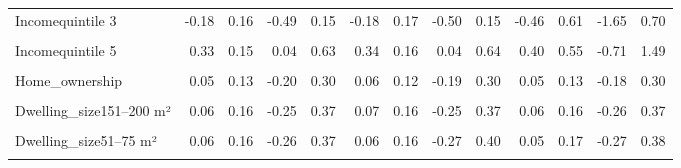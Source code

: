 \begin{table}
\begin{tabular}[t]{lrrrrrrrrrrrr}
Incomequintile 3 & -0.18 & 0.16 & -0.49 & 0.15 & -0.18 & 0.17 & -0.50 & 0.15 & -0.46 & 0.61 & -1.65 & 0.70\\
\cellcolor{gray!10}{Incomequintile 4} & \cellcolor{gray!10}{0.27} & \cellcolor{gray!10}{0.15} & \cellcolor{gray!10}{-0.03} & \cellcolor{gray!10}{0.56} & \cellcolor{gray!10}{0.27} & \cellcolor{gray!10}{0.15} & \cellcolor{gray!10}{-0.03} & \cellcolor{gray!10}{0.58} & \cellcolor{gray!10}{-0.30} & \cellcolor{gray!10}{0.58} & \cellcolor{gray!10}{-1.54} & \cellcolor{gray!10}{0.82}\\
Incomequintile 5 & 0.33 & 0.15 & 0.04 & 0.63 & 0.34 & 0.16 & 0.04 & 0.64 & 0.40 & 0.55 & -0.71 & 1.49\\
\cellcolor{gray!10}{Higher\_edu} & \cellcolor{gray!10}{0.29} & \cellcolor{gray!10}{0.10} & \cellcolor{gray!10}{0.09} & \cellcolor{gray!10}{0.48} & \cellcolor{gray!10}{0.29} & \cellcolor{gray!10}{0.10} & \cellcolor{gray!10}{0.08} & \cellcolor{gray!10}{0.48} & \cellcolor{gray!10}{0.28} & \cellcolor{gray!10}{0.10} & \cellcolor{gray!10}{0.09} & \cellcolor{gray!10}{0.48}\\
Home\_ownership & 0.05 & 0.13 & -0.20 & 0.30 & 0.06 & 0.12 & -0.19 & 0.30 & 0.05 & 0.13 & -0.18 & 0.30\\
\cellcolor{gray!10}{Dwelling\_house} & \cellcolor{gray!10}{-0.19} & \cellcolor{gray!10}{0.12} & \cellcolor{gray!10}{-0.41} & \cellcolor{gray!10}{0.05} & \cellcolor{gray!10}{-0.19} & \cellcolor{gray!10}{0.12} & \cellcolor{gray!10}{-0.43} & \cellcolor{gray!10}{0.05} & \cellcolor{gray!10}{-0.19} & \cellcolor{gray!10}{0.12} & \cellcolor{gray!10}{-0.42} & \cellcolor{gray!10}{0.05}\\
Dwelling\_size151–200 m² & 0.06 & 0.16 & -0.25 & 0.37 & 0.07 & 0.16 & -0.25 & 0.37 & 0.06 & 0.16 & -0.26 & 0.37\\
\cellcolor{gray!10}{Dwelling\_size26–50 m²} & \cellcolor{gray!10}{-0.05} & \cellcolor{gray!10}{0.23} & \cellcolor{gray!10}{-0.51} & \cellcolor{gray!10}{0.40} & \cellcolor{gray!10}{-0.04} & \cellcolor{gray!10}{0.24} & \cellcolor{gray!10}{-0.55} & \cellcolor{gray!10}{0.42} & \cellcolor{gray!10}{-0.07} & \cellcolor{gray!10}{0.23} & \cellcolor{gray!10}{-0.52} & \cellcolor{gray!10}{0.38}\\
Dwelling\_size51–75 m² & 0.06 & 0.16 & -0.26 & 0.37 & 0.06 & 0.16 & -0.27 & 0.40 & 0.05 & 0.17 & -0.27 & 0.38\\
\cellcolor{gray!10}{Dwelling\_size76–100 m²} & \cellcolor{gray!10}{0.00} & \cellcolor{gray!10}{0.14} & \cellcolor{gray!10}{-0.29} & \cellcolor{gray!10}{0.27} & \cellcolor{gray!10}{0.01} & \cellcolor{gray!10}{0.14} & \cellcolor{gray!10}{-0.28} & \cellcolor{gray!10}{0.28} & \cellcolor{gray!10}{-0.01} & \cellcolor{gray!10}{0.15} & \cellcolor{gray!10}{-0.30} & \cellcolor{gray!10}{0.28}\\

\end{tabular}
\end{table}

